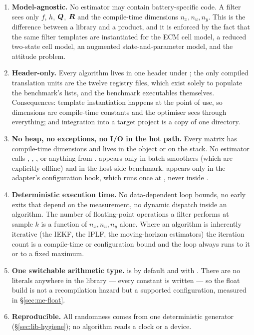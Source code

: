 \begin{enumerate}[leftmargin=*,topsep=2pt,itemsep=3pt]
\item \textbf{Model-agnostic.} No estimator may contain battery-specific code. A filter sees only
$f$, $h$, $\bm{Q}$, $\bm{R}$ and the compile-time dimensions $n_x, n_u, n_y$. This is the difference
between a library and a product, and it is enforced by the fact that the same filter templates are
instantiated for the ECM cell model, a reduced two-state cell model, an augmented
state-and-parameter model, and the attitude problem.

\item \textbf{Header-only.} Every algorithm lives in one header under
; the only compiled translation units are the twelve registry files, which
exist solely to populate the benchmark's lists, and the benchmark executables themselves.
Consequences: template instantiation happens at the point of use, so dimensions are compile-time
constants and the optimiser sees through everything; and integration into a target project is a
copy of one directory.

\item \textbf{No heap, no exceptions, no I/O in the hot path.} Every matrix has compile-time
dimensions and lives in the object or on the stack. No estimator calls ,
, ,  or anything from .
 appears only in batch smoothers (which are explicitly offline) and in the
host-side benchmark.  appears only in the  adapter's
configuration hook, which runs once at , never inside .

\item \textbf{Deterministic execution time.} No data-dependent loop bounds, no early exits that
depend on the measurement, no dynamic dispatch inside an algorithm. The number of floating-point
operations a filter performs at sample $k$ is a function of $n_x, n_u, n_y$ alone. Where an
algorithm is inherently iterative (the IEKF, the IPLF, the moving-horizon estimators) the
iteration count is a compile-time or configuration bound and the loop always runs to it or to a
fixed maximum.

\item \textbf{One switchable arithmetic type.}  is  by default and
 with . There are no  literals anywhere in the
library --- every constant is written  --- so the float build is not a
recompilation hazard but a supported configuration, measured in \S\ref{sec:me-float}.

\item \textbf{Reproducible.} All randomness comes from one deterministic generator
(\S\ref{sec:lib-hygiene}); no algorithm reads a clock or a device.
\end{enumerate}

